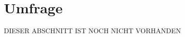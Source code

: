 \chapter{Umfrage}
\authortoc{\dario}{\chapterident}
DIESER ABSCHNITT IST NOCH NICHT VORHANDEN
\newline
\newline
\lipsum[4-8][32-64]